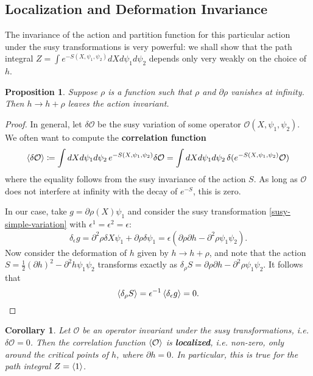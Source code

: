 \documentclass{report}
\theoremstyle{plain}
\newtheorem{proposition}[theorem]{Proposition}
\newtheorem{corollary}[theorem]{Corollary}
\theoremstyle{definition}
\theoremstyle{remark}
\newcommand{\di}{\partial}
\newcommand{\cO}{\mathcal{O}}
\newcommand{\FR}[2]{\frac{#1}{#2}}
\begin{document}
\subsection{Localization and Deformation Invariance}
The invariance of the action and partition function for this
particular action under the susy transformations is very powerful: we
shall show that the path integral $Z = \int e^{-S(X, \psi_1, \psi_2)}
dX d\psi_1 d\psi_2$ depends only very weakly on the choice of $h$.

\begin{proposition} \label{thm:action-deformation-invariance}
  Suppose $\rho$ is a function such that $\rho$ and $\di\rho$ vanishes
  at infinity. Then $h \to h+\rho$ leaves the action invariant.
\end{proposition}

\begin{proof}
  In general, let $\delta \cO$ be the susy variation of some operator
  $\cO(X, \psi_1, \psi_2)$. We often want to compute the {\bf
    correlation function}
  \[ \braket{\delta \cO} \coloneqq \int dX d\psi_1 d\psi_2 \, e^{-S(X, \psi_1, \psi_2)} \delta \cO = \int dX d\psi_1 d\psi_2 \, \delta(e^{-S(X, \psi_1, \psi_2)} \cO) \]
  where the equality follows from the susy invariance of the action
  $S$. As long as $\cO$ does not interfere at infinity with the decay
  of $e^{-S}$, this is zero.

  In our case, take $g = \di\rho(X)\psi_1$ and consider the susy
  transformation \ref{susy-simple-variation} with $\epsilon^1 =
  \epsilon^2 = \epsilon$:
  \[ \delta_\epsilon g = \di^2 \rho \delta X \psi_1 + \di \rho \delta \psi_1 = \epsilon(\di \rho \di h - \di^2\rho \psi_1 \psi_2). \]
  Now consider the deformation of $h$ given by $h\to h+\rho$, and note
  that the action $S = \FR{1}{2}(\di h)^2 - \di^2h \psi_1\psi_2$
  transforms exactly as $\delta_\rho S = \di \rho \di h - \di^2\rho \psi_1 \psi_2$. It follows that
  \[ \braket{\delta_\rho S} =\epsilon^{-1}\braket{\delta_\epsilon g}=0. \qedhere \]
\end{proof}

\begin{corollary} \label{thm:path-integral-localization}
  Let $\cO$ be an operator invariant under the susy transformations,
  i.e. $\delta \cO = 0$. Then the correlation function $\braket{\cO}$
  is {\bf localized}, i.e. non-zero, only around the critical points
  of $h$, where $\di h = 0$. In particular, this is true for the path
  integral $Z = \braket{1}$.
\end{corollary}
\end{document}
